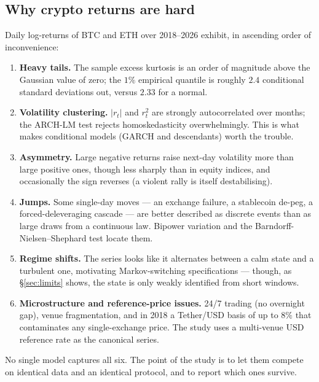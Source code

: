 \documentclass[11pt,a4paper]{article}
\begin{document}
\subsection{Why crypto returns are hard}\label{sec:stylized}

Daily log-returns of BTC and ETH over 2018--2026 exhibit, in ascending order of
inconvenience:

\begin{enumerate}[nosep,label=(\roman*)]
\item \textbf{Heavy tails.} The sample excess kurtosis is an order of magnitude
      above the Gaussian value of zero; the $1\%$ empirical quantile is roughly
      $2.4$ conditional standard deviations out, versus $2.33$ for a normal.
\item \textbf{Volatility clustering.} $|r_t|$ and $r_t^2$ are strongly
      autocorrelated over months; the ARCH-LM test rejects homoskedasticity
      overwhelmingly. This is what makes conditional models (GARCH and
      descendants) worth the trouble.
\item \textbf{Asymmetry.} Large negative returns raise next-day volatility more
      than large positive ones, though less sharply than in equity indices, and
      occasionally the sign reverses (a violent rally is itself
      destabilising).
\item \textbf{Jumps.} Some single-day moves --- an exchange failure, a
      stablecoin de-peg, a forced-deleveraging cascade --- are better described
      as discrete events than as large draws from a continuous law. Bipower
      variation and the Barndorff-Nielsen--Shephard test locate them.
\item \textbf{Regime shifts.} The series looks like it alternates between a calm
      state and a turbulent one, motivating Markov-switching specifications ---
      though, as \S\ref{sec:limits} shows, the state is only weakly identified
      from short windows.
\item \textbf{Microstructure and reference-price issues.} 24/7 trading (no
      overnight gap), venue fragmentation, and in 2018 a Tether/USD basis of up
      to $8\%$ that contaminates any single-exchange price. The study uses a
      multi-venue USD reference rate as the canonical series.
\end{enumerate}

No single model captures all six. The point of the study is to let them compete
on identical data and an identical protocol, and to report which ones survive.
\end{document}
